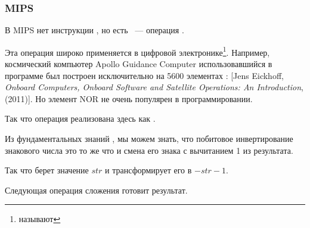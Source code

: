 ﻿\subsubsection{MIPS}



В MIPS нет инструкции \NOT, но есть \NOR~--- операция .

Эта операция широко применяется в цифровой электронике\footnote{\NOR называют }.
Например, космический компьютер Apollo Guidance Computer использовавшийся в программе  был
построен исключительно на 5600 элементах \NOR: 
[Jens Eickhoff, \emph{Onboard Computers, Onboard Software and Satellite Operations: An Introduction}, (2011)].
Но элемент NOR не очень популярен в программировании.

Так что операция \NOT реализована здесь как .

Из фундаментальных знаний , мы можем знать, что побитовое инвертирование знакового
числа это то же что и смена его знака с вычитанием 1 из результата.

Так что \NOT берет значение $str$ и трансформирует его в $-str-1$.

Следующая операция сложения готовит результат.

